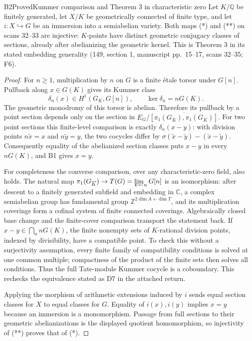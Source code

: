 \begin{result}{B2}{Proved}{Kummer comparison and Theorem 3 in characteristic zero}
\label{res:B2}
Let $K/\mathbb Q$ be finitely generated, let $X/K$ be geometrically
connected of finite type, and let $i:X\hookrightarrow G$ be an immersion
into a semiabelian variety. Both maps (*) and (**) on scans 32--33 are
injective: $K$-points have distinct geometric conjugacy classes of
sections, already after abelianizing the geometric kernel. This is
Theorem 3 in its stated embedding generality (149, section 1, manuscript
pp.~15--17, scans 32--35; F6).
\end{result}
\begin{proof}
For $n\geq1$, multiplication by $n$ on $G$ is a finite \'etale torsor
under $G[n]$. Pullback along $x\in G(K)$ gives its Kummer class
\[
 \delta_n(x)\in H^1(G_K,G[n]),\qquad
 \ker\delta_n=nG(K).
\]
The geometric monodromy of this torsor is abelian. Therefore its
pullback by a point section depends only on the section in
$E_G/\overline{[\pi_1(G_{\overline K}),\pi_1(G_{\overline K})]}$.
For two point sections this finite-level comparison is exactly
$\delta_n(x-y)$: with division points $n\widetilde x=x$ and
$n\widetilde y=y$, the two cocycles differ by
$\sigma(\widetilde x-\widetilde y)-(
\widetilde x-\widetilde y)$.
Consequently equality of the abelianized section classes puts $x-y$
in every $nG(K)$, and B1 gives $x=y$.

For completeness the converse comparison, over any characteristic-zero
field, also holds. The natural map
$\pi_1(G_{\overline K})\to T(G)=\varprojlim_nG[n]$ is an isomorphism:
after descent to a finitely generated subfield and embedding in $\mathbb C$,
a complex semiabelian group has fundamental group $\mathbb Z^{2\dim A+\dim T}$,
and its multiplication coverings form a cofinal system of finite connected
coverings. Algebraically closed base change and the finite-cover comparison
transport the statement back. If $x-y\in\bigcap_n nG(K)$, the finite
nonempty sets of $K$-rational division points, indexed by divisibility,
have a compatible point. To check this without a surjectivity assumption,
every finite family of compatibility conditions is solved at one common
multiple; compactness of the product of the finite sets then solves all
conditions. Thus the full Tate-module Kummer cocycle is a coboundary.
This rechecks the equivalence stated as D7 in the attached return.

Applying the morphism of arithmetic extensions induced by $i$ sends equal
section classes for $X$ to equal classes for $G$. Equality of $i(x),i(y)$
implies $x=y$ because an immersion is a monomorphism. Passage from full
sections to their geometric abelianizations is the displayed quotient
homomorphism, so injectivity of (**) proves that of (*).


\end{proof}
